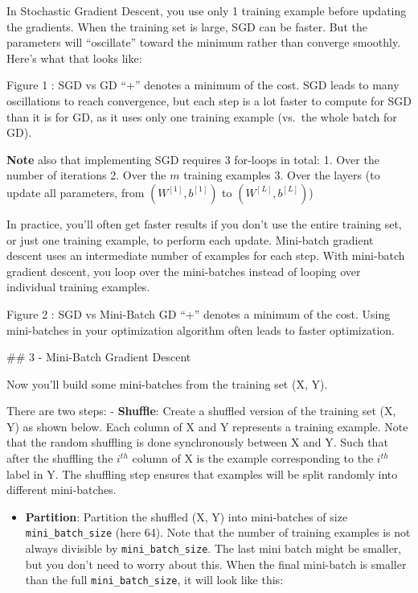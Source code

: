 \documentclass[11pt]{article}
\providecommand{\tightlist}{%
      \setlength{\itemsep}{0pt}\setlength{\parskip}{0pt}}
\begin{document}
    In Stochastic Gradient Descent, you use only 1 training example before
updating the gradients. When the training set is large, SGD can be
faster. But the parameters will ``oscillate'' toward the minimum rather
than converge smoothly. Here's what that looks like:

Figure 1 : SGD vs GD ``+'' denotes a minimum of the cost. SGD leads to
many oscillations to reach convergence, but each step is a lot faster to
compute for SGD than it is for GD, as it uses only one training example
(vs.~the whole batch for GD).

\textbf{Note} also that implementing SGD requires 3 for-loops in total:
1. Over the number of iterations 2. Over the \(m\) training examples 3.
Over the layers (to update all parameters, from \((W^{[1]},b^{[1]})\) to
\((W^{[L]},b^{[L]})\))

In practice, you'll often get faster results if you don't use the entire
training set, or just one training example, to perform each update.
Mini-batch gradient descent uses an intermediate number of examples for
each step. With mini-batch gradient descent, you loop over the
mini-batches instead of looping over individual training examples.

Figure 2 : SGD vs Mini-Batch GD ``+'' denotes a minimum of the cost.
Using mini-batches in your optimization algorithm often leads to faster
optimization.

    \#\# 3 - Mini-Batch Gradient Descent

Now you'll build some mini-batches from the training set (X, Y).

There are two steps: - \textbf{Shuffle}: Create a shuffled version of
the training set (X, Y) as shown below. Each column of X and Y
represents a training example. Note that the random shuffling is done
synchronously between X and Y. Such that after the shuffling the
\(i^{th}\) column of X is the example corresponding to the \(i^{th}\)
label in Y. The shuffling step ensures that examples will be split
randomly into different mini-batches.

\begin{itemize}
\tightlist
\item
  \textbf{Partition}: Partition the shuffled (X, Y) into mini-batches of
  size \texttt{mini\_batch\_size} (here 64). Note that the number of
  training examples is not always divisible by
  \texttt{mini\_batch\_size}. The last mini batch might be smaller, but
  you don't need to worry about this. When the final mini-batch is
  smaller than the full \texttt{mini\_batch\_size}, it will look like
  this:
\end{itemize}
\end{document}
